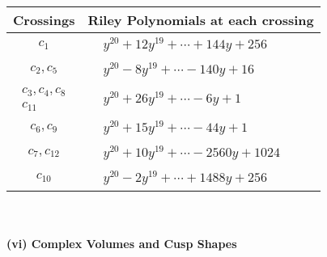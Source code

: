 \documentclass[1p]{elsarticle_modified}
\theoremstyle{definition}
\begin{document}
\begin{tabular}{m{50pt}|m{274pt}}
Crossings & \hspace{64pt}Riley Polynomials at each crossing \\
\hline $$\begin{aligned}c_{1}\end{aligned}$$&$\begin{aligned}
&y^{20}+12 y^{19}+\cdots+144 y+256
\end{aligned}$\\
\hline $$\begin{aligned}c_{2},c_{5}\end{aligned}$$&$\begin{aligned}
&y^{20}-8 y^{19}+\cdots-140 y+16
\end{aligned}$\\
\hline $$\begin{aligned}c_{3},c_{4},c_{8}\\c_{11}\end{aligned}$$&$\begin{aligned}
&y^{20}+26 y^{19}+\cdots-6 y+1
\end{aligned}$\\
\hline $$\begin{aligned}c_{6},c_{9}\end{aligned}$$&$\begin{aligned}
&y^{20}+15 y^{19}+\cdots-44 y+1
\end{aligned}$\\
\hline $$\begin{aligned}c_{7},c_{12}\end{aligned}$$&$\begin{aligned}
&y^{20}+10 y^{19}+\cdots-2560 y+1024
\end{aligned}$\\
\hline $$\begin{aligned}c_{10}\end{aligned}$$&$\begin{aligned}
&y^{20}-2 y^{19}+\cdots+1488 y+256
\end{aligned}$\\
\hline
\end{tabular}\\~\\
\newpage\flushleft \textbf{(vi) Complex Volumes and Cusp Shapes}
\end{document}
